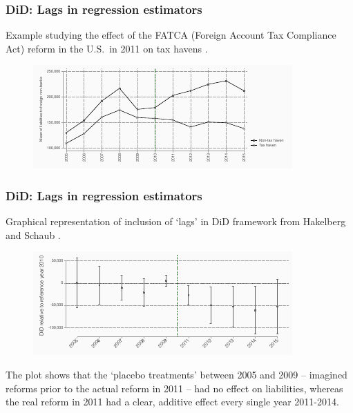 \documentclass[12pt,english,dvipsnames,aspectratio=169,handout]{beamer}\usepackage[]{graphicx}\usepackage[]{xcolor}
\begin{document}
\begin{frame}
  \frametitle{DiD: Lags in regression estimators}
\footnotesize

Example studying the effect of the FATCA (Foreign Account Tax Compliance Act) reform in the U.S.\ in 2011 on tax havens \cite{hakelberg_redistributive_2018}. 

	 \begin{figure} 
    \includegraphics[height=.65\textheight,keepaspectratio=true]{../04-figures/08/04-fatcatrend.pdf}
    \end{figure}

\end{frame}


\begin{frame}
  \frametitle{DiD: Lags in regression estimators}
\footnotesize

Graphical representation of inclusion of `lags' in DiD framework from Hakelberg and Schaub \citeyear{hakelberg_redistributive_2018}.

	 \begin{figure} 
    \includegraphics[height=.5\textheight,keepaspectratio=true]{../04-figures/08/05-fatca.pdf}
    \end{figure}

The plot shows that the `placebo treatments' between 2005 and 2009 -- imagined reforms prior to the actual reform in 2011 -- had no effect on liabilities, whereas the real reform in 2011 had a clear, additive effect every single year 2011-2014.

\end{frame}
\end{document}
